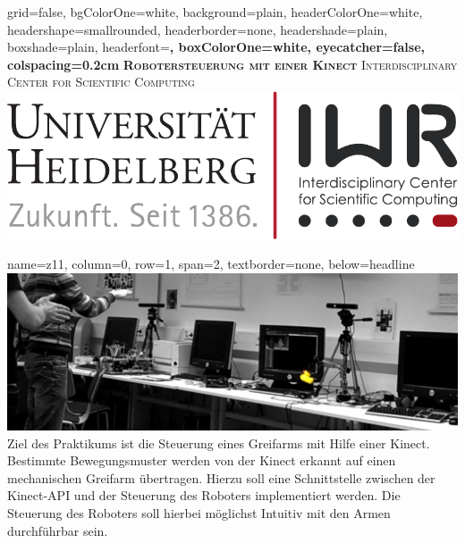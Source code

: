 \documentclass[portrait,a0paper]{baposter}
\begin{document}
\begin{poster}
  {
  grid=false,
  bgColorOne=white,
  background=plain,
  headerColorOne=white,
  headershape=smallrounded,
  headerborder=none,
  headershade=plain,
  boxshade=plain,
  headerfont=\Large\bf\textsf,
  boxColorOne=white,
  eyecatcher=false,
  colspacing=0.2cm
  }
  { } 
 {\bf\textsc{Robotersteuerung mit einer Kinect}\vspace{0.5em}}
  {
  \textsc{Interdisciplinary Center for Scientific Computing}  \vspace*{0.5em} \\

  }
  {%
    \includegraphics[scale=0.5]{imgs/IWR_Logo.pdf}
  }
 
 
    {
    name=z11,
    column=0,
    row=1,
    span=2,
    textborder=none,
    below=headline
    }
    {
    \includegraphics[width=\textwidth]{imgs/tmp_img.png}
Ziel des Praktikums ist die Steuerung eines Greifarms mit Hilfe einer Kinect.
Bestimmte Bewegungsmuster werden von der Kinect erkannt auf einen mechanischen Greifarm übertragen.
Hierzu soll eine Schnittstelle zwischen der Kinect-API und der Steuerung des Roboters implementiert werden.
Die Steuerung des Roboters soll hierbei möglichst Intuitiv mit den Armen durchführbar sein.
 }


\end{poster}
\end{document}
